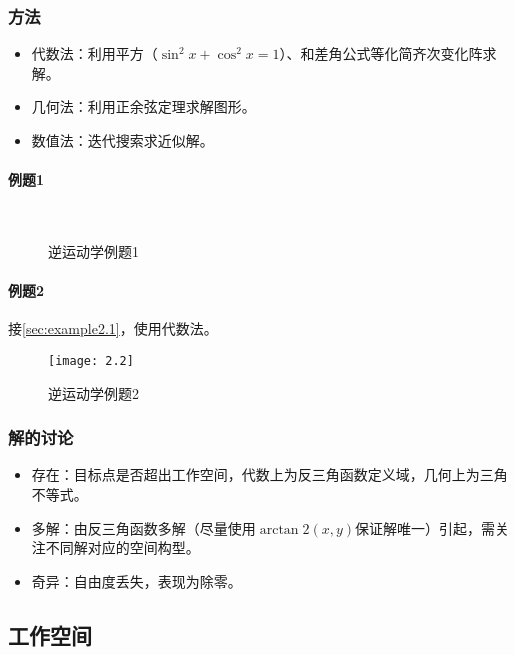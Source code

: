 \documentclass[
12pt, %
a4paper, 
oneside, %
headinclude,footinclude, %
]{scrartcl}
\begin{document}
\subsubsection{方法}
\begin{itemize}
\item 代数法：利用平方（$ \sin^2x + \cos^2x = 1 $）、和差角公式等化简齐次变化阵求解。
\item 几何法：利用正余弦定理求解图形。
\item 数值法：迭代搜索求近似解。
\end{itemize} 
\paragraph{例题1}
\begin{figure}[H]
\centering
\subfloat[代数法]{\texttt{[image: 3.1]}} \\
\subfloat[几何法]{\texttt{[image: 3.2]}}
\caption[逆运动学例题1]{逆运动学例题1}
\end{figure}
\paragraph{例题2}\label{sec:example2.2}
{\footnotesize
接\ref{sec:example2.1}，使用代数法。
}
\begin{figure}[H]
\centering 
\texttt{[image: 2.2]} 
\caption[逆运动学例题2]{逆运动学例题2}
\end{figure}
\subsubsection{解的讨论}
\begin{itemize}
\item 存在：目标点是否超出工作空间，代数上为反三角函数定义域，几何上为三角不等式。
\item 多解：由反三角函数多解（尽量使用$ \arctan2(x, y) $保证解唯一）引起，需关注不同解对应的空间构型。
\item 奇异：自由度丢失，表现为除零。
\end{itemize} 
\subsection{工作空间}
\end{document}
